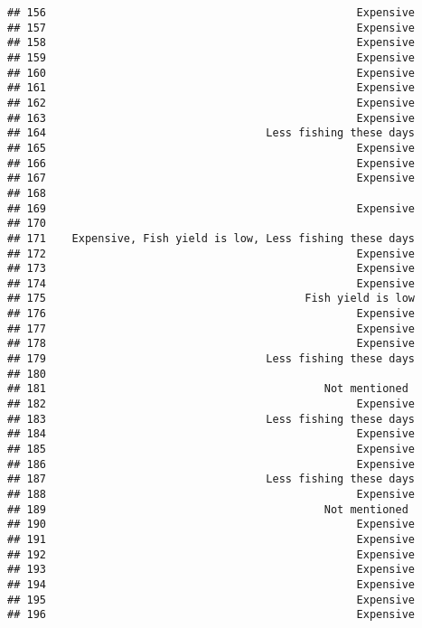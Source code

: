 \documentclass[
]{article}
\begin{document}
\begin{verbatim}
## 156                                                Expensive
## 157                                                Expensive
## 158                                                Expensive
## 159                                                Expensive
## 160                                                Expensive
## 161                                                Expensive
## 162                                                Expensive
## 163                                                Expensive
## 164                                  Less fishing these days
## 165                                                Expensive
## 166                                                Expensive
## 167                                                Expensive
## 168                                                         
## 169                                                Expensive
## 170                                                         
## 171    Expensive, Fish yield is low, Less fishing these days
## 172                                                Expensive
## 173                                                Expensive
## 174                                                Expensive
## 175                                        Fish yield is low
## 176                                                Expensive
## 177                                                Expensive
## 178                                                Expensive
## 179                                  Less fishing these days
## 180                                                         
## 181                                           Not mentioned 
## 182                                                Expensive
## 183                                  Less fishing these days
## 184                                                Expensive
## 185                                                Expensive
## 186                                                Expensive
## 187                                  Less fishing these days
## 188                                                Expensive
## 189                                           Not mentioned 
## 190                                                Expensive
## 191                                                Expensive
## 192                                                Expensive
## 193                                                Expensive
## 194                                                Expensive
## 195                                                Expensive
## 196                                                Expensive

\end{verbatim}
\end{document}
